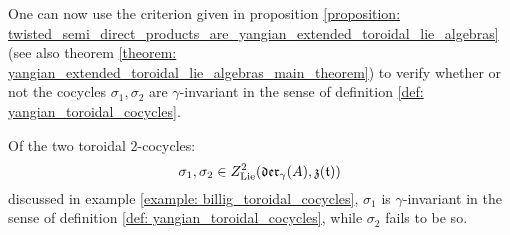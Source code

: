         One can now use the criterion given in proposition \ref{proposition: twisted_semi_direct_products_are_yangian_extended_toroidal_lie_algebras} (see also theorem \ref{theorem: yangian_extended_toroidal_lie_algebras_main_theorem}) to verify whether or not the cocycles $\sigma_1, \sigma_2$ are $\gamma$-invariant in the sense of definition \ref{def: yangian_toroidal_cocycles}.
        \begin{proposition} \label{prop: invariance_of_billig_toroidal_cocycles}
            Of the two toroidal $2$-cocycles:
                $$\sigma_1, \sigma_2 \in Z^2_{\mathrm{Lie}}(\mathfrak{der}_{\gamma}(A), \mathfrak{z}(\mathfrak{t}))$$
            discussed in example \ref{example: billig_toroidal_cocycles}, $\sigma_1$ is $\gamma$-invariant in the sense of definition \ref{def: yangian_toroidal_cocycles}, while $\sigma_2$ fails to be so.
        \end{proposition}
